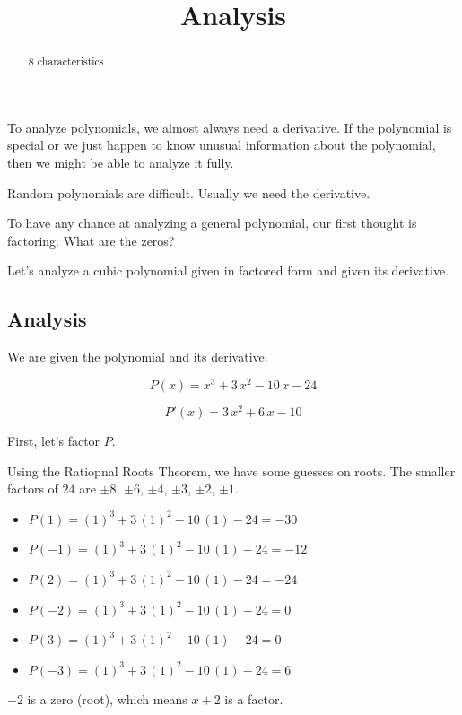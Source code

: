\documentclass{ximera}
\title{Analysis}
\begin{document}
\begin{abstract}
8 characteristics
\end{abstract}
\maketitle



To analyze polynomials, we almost always need a derivative.  If the polynomial is special or we just happen to know unusual information about the polynomial, then we might be able to analyze it fully. 

Random polynomials are difficult. Usually we need the derivative. 

To have any chance at analyzing a general polynomial, our first thought is factoring. What are the zeros? 


Let's analyze a cubic polynomial given in factored form and given its derivative. 


\subsection*{Analysis}


We are given the polynomial and its derivative. 


\[
P(x) = x^3 + 3 \, x^2 - 10 \, x - 24
\]


\[
P'(x) = 3 \, x^2 + 6 \, x - 10
\]



First, let's factor $P$. 

Using the Ratiopnal Roots Theorem, we have some guesses on roots.  The smaller factors of $24$ are $\pm8$, $\pm6$, $\pm4$, $\pm3$, $\pm2$, $\pm1$.  



\begin{itemize}
	\item $P(1) = (1)^3 + 3 \, (1)^2 - 10 \, (1) - 24 = -30$
	\item $P(-1) = (1)^3 + 3 \, (1)^2 - 10 \, (1) - 24 = -12$
	\item $P(2) = (1)^3 + 3 \, (1)^2 - 10 \, (1) - 24 = -24$
	\item $P(-2) = (1)^3 + 3 \, (1)^2 - 10 \, (1) - 24 = 0$
	\item $P(3) = (1)^3 + 3 \, (1)^2 - 10 \, (1) - 24 = 0$
	\item $P(-3) = (1)^3 + 3 \, (1)^2 - 10 \, (1) - 24 = 6$
\end{itemize}

$-2$ is a zero (root), which means $x+2$ is a factor. 
\end{document}
